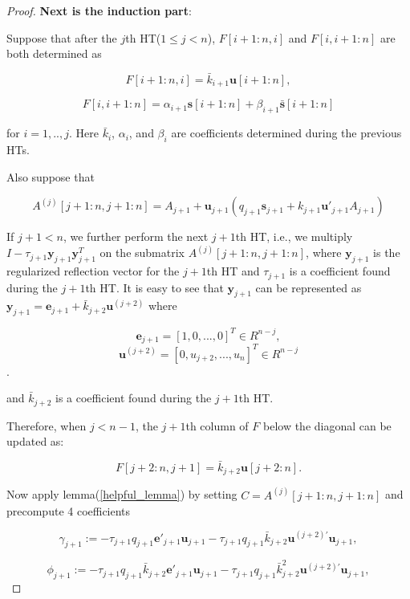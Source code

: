\documentclass{article}
\begin{document}
\begin{proof}
\textbf{Next is the induction part}:

Suppose that after the $j$th HT($1\leq j<n$), $F[i+1:n, i]$ and $F[i,i+1:n]$ are both determined as

\begin{equation}
    F[i+1:n, i]=\bar{k}_{i+1}\mathbf{u}[i+1:n],\label{F_tril}
\end{equation}

\begin{equation}
    F[i,i+1:n]=\alpha_{i+1}\mathbf{s}[i+1:n]+\beta_{i+1}\bar{\mathbf{s}}[i+1:n] \label{F_triu}
\end{equation}

for $i=1,..,j$. Here $\bar{k}_i$, $\alpha_i$, and $\beta_i$ are coefficients determined during the previous HTs.

Also suppose that 

\begin{equation}
    A^{(j)}[j+1:n,j+1:n]=A_{j+1}+\mathbf{u}_{j+1}(q_{j+1}\mathbf{s}_{j+1}+k_{j+1}\mathbf{u}'_{j+1}A_{j+1})\label{After_HT}
\end{equation}

If $j+1<n$, we further perform the next $j+1$th HT, i.e., we multiply $I-\tau_{j+1} \mathbf{y}_{j+1} \mathbf{y}_{j+1}^T$ on the submatrix $A^{(j)}[j+1:n,j+1:n]$, where $\mathbf{y}_{j+1}$ is the regularized reflection vector for the $j+1$th HT and $\tau_{j+1}$ is a coefficient found during the $j+1$th HT. It is easy to see that $\mathbf{y}_{j+1}$ can be represented as $\mathbf{y}_{j+1}=\mathbf{e}_{j+1}+\bar{k}_{j+2}\mathbf{u}^{(j+2)}$ where 

$$
\mathbf{e}_{j+1}=[1,0,...,0]^T\in R^{n-j},
$$ 
$$
\mathbf{u}^{(j+2)}=[0, u_{j+2},...,u_n]^T\in R^{n-j}
$$.

and $\bar{k}_{j+2}$ is a coefficient found during the $j+1$th HT. 

Therefore, when $j<n-1$, the $j+1$th column of $F$ below the diagonal can be updated as:

\begin{equation}
    F[j+2:n,j+1]=\bar{k}_{j+2}\mathbf{u}[j+2:n].\label{F_tril_2}
\end{equation}

Now apply lemma(\ref{helpful_lemma}) by setting $C=A^{(j)}[j+1:n,j+1:n]$ and precompute 4 coefficients  

$$\gamma_{j+1}:=-\tau_{j+1} q_{j+1}\mathbf{e'}_{j+1}\mathbf{u}_{j+1}-\tau_{j+1} q_{j+1}\bar{k}_{j+2}\mathbf{u}^{(j+2)'}\mathbf{u}_{j+1},$$

$$\phi_{j+1}:=-\tau_{j+1} q_{j+1}\bar{k}_{j+2}\mathbf{e'}_{j+1}\mathbf{u}_{j+1}-\tau_{j+1} q_{j+1}\bar{k}_{j+2}^2\mathbf{u}^{(j+2)'}\mathbf{u}_{j+1},$$


\end{proof}
\end{document}
